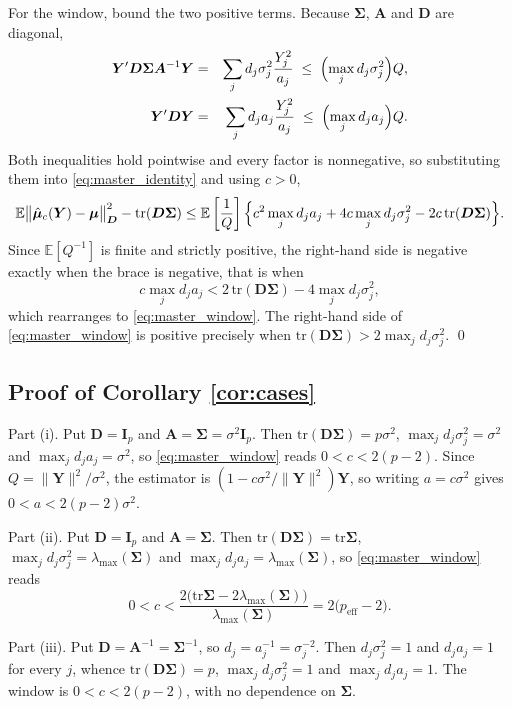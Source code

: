\documentclass[pdflatex,sn-mathphys-num]{sn-jnl}%
\theoremstyle{thmstyleone}%
\theoremstyle{thmstyletwo}%
\theoremstyle{thmstylethree}%
\newcommand{\peff}{p_{\mathrm{eff}}}
\newcommand{\tr}{\mathrm{tr}}
\newcommand{\E}{\mathbb{E}}
\begin{document}
\begin{appendices}
For the window, bound the two positive terms. Because $\bm\Sigma$, $\bm A$ and $\bm D$ are diagonal,
\begin{eqnarray}
\bm Y'\bm D\bm\Sigma\bm A^{-1}\bm Y
&=&
\sum_{j}d_j\sigma^2_j\frac{Y^2_j}{a_j}
\;\le\;
\Bigl(\max_{j}d_j\sigma^2_j\Bigr)Q,
\cr
\bm Y'\bm D\bm Y
&=&
\sum_{j}d_ja_j\frac{Y^2_j}{a_j}
\;\le\;
\Bigl(\max_{j}d_ja_j\Bigr)Q .
\end{eqnarray}
Both inequalities hold pointwise and every factor is nonnegative, so substituting them into \eqref{eq:master_identity} and using $c>0$,
\begin{equation}
\label{eq:pf_window}
\E\bigl\|\hat{\bm\mu}_c(\bm Y)-\bm\mu\bigr\|^2_{\bm D}-\tr(\bm D\bm\Sigma)
\le
\E\left[\frac{1}{Q}\right]
\Bigl\{
c^{2}\max_{j}d_ja_j
+4c\max_{j}d_j\sigma^2_j
-2c\,\tr(\bm D\bm\Sigma)
\Bigr\}.
\end{equation}
Since $\E[Q^{-1}]$ is finite and strictly positive, the right-hand side is negative exactly when the brace is negative, that is when
\begin{equation}
c\max_{j}d_ja_j<2\,\tr(\bm D\bm\Sigma)-4\max_{j}d_j\sigma^2_j ,
\end{equation}
which rearranges to \eqref{eq:master_window}. The right-hand side of \eqref{eq:master_window} is positive precisely when $\tr(\bm D\bm\Sigma)>2\max_jd_j\sigma^2_j$. \qed

\subsection*{Proof of Corollary \ref{cor:cases}}

Part (i). Put $\bm D=\bm I_p$ and $\bm A=\bm\Sigma=\sigma^2\bm I_p$. Then $\tr(\bm D\bm\Sigma)=p\sigma^2$, $\max_jd_j\sigma^2_j=\sigma^2$ and $\max_jd_ja_j=\sigma^2$, so \eqref{eq:master_window} reads $0<c<2(p-2)$. Since $Q=\|\bm Y\|^2/\sigma^2$, the estimator is $(1-c\sigma^2/\|\bm Y\|^2)\bm Y$, so writing $a=c\sigma^2$ gives $0<a<2(p-2)\sigma^2$.

Part (ii). Put $\bm D=\bm I_p$ and $\bm A=\bm\Sigma$. Then $\tr(\bm D\bm\Sigma)=\tr\bm\Sigma$, $\max_jd_j\sigma^2_j=\lambda_{\max}(\bm\Sigma)$ and $\max_jd_ja_j=\lambda_{\max}(\bm\Sigma)$, so \eqref{eq:master_window} reads
\begin{equation}
0<c<\frac{2\bigl(\tr\bm\Sigma-2\lambda_{\max}(\bm\Sigma)\bigr)}{\lambda_{\max}(\bm\Sigma)}
=2\bigl(\peff-2\bigr).
\end{equation}

Part (iii). Put $\bm D=\bm A^{-1}=\bm\Sigma^{-1}$, so $d_j=a_j^{-1}=\sigma^{-2}_j$. Then $d_j\sigma^2_j=1$ and $d_ja_j=1$ for every $j$, whence $\tr(\bm D\bm\Sigma)=p$, $\max_jd_j\sigma^2_j=1$ and $\max_jd_ja_j=1$. The window is $0<c<2(p-2)$, with no dependence on $\bm\Sigma$.


\end{appendices}
\end{document}
